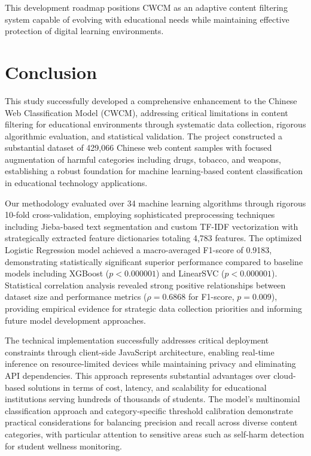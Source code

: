 \documentclass[
  titlepage]{article}
\begin{document}
This development roadmap positions CWCM as an adaptive content filtering
system capable of evolving with educational needs while maintaining
effective protection of digital learning environments.

\section{Conclusion}\label{conclusion}

This study successfully developed a comprehensive enhancement to the
Chinese Web Classification Model (CWCM), addressing critical limitations
in content filtering for educational environments through systematic
data collection, rigorous algorithmic evaluation, and statistical
validation. The project constructed a substantial dataset of 429,066
Chinese web content samples with focused augmentation of harmful
categories including drugs, tobacco, and weapons, establishing a robust
foundation for machine learning-based content classification in
educational technology applications.

Our methodology evaluated over 34 machine learning algorithms through
rigorous 10-fold cross-validation, employing sophisticated preprocessing
techniques including Jieba-based text segmentation and custom TF-IDF
vectorization with strategically extracted feature dictionaries totaling
4,783 features. The optimized Logistic Regression model achieved a
macro-averaged F1-score of 0.9183, demonstrating statistically
significant superior performance compared to baseline models including
XGBoost (\(p < 0.000001\)) and LinearSVC (\(p < 0.000001\)). Statistical
correlation analysis revealed strong positive relationships between
dataset size and performance metrics (\(\rho = 0.6868\) for F1-score,
\(p = 0.009\)), providing empirical evidence for strategic data
collection priorities and informing future model development approaches.

The technical implementation successfully addresses critical deployment
constraints through client-side JavaScript architecture, enabling
real-time inference on resource-limited devices while maintaining
privacy and eliminating API dependencies. This approach represents
substantial advantages over cloud-based solutions in terms of cost,
latency, and scalability for educational institutions serving hundreds
of thousands of students. The model's multinomial classification
approach and category-specific threshold calibration demonstrate
practical considerations for balancing precision and recall across
diverse content categories, with particular attention to sensitive areas
such as self-harm detection for student wellness monitoring.
\end{document}
